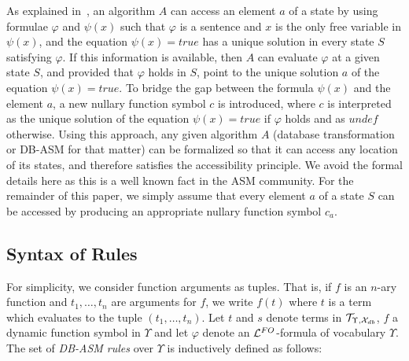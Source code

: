 \documentclass[preprint,11pt]{elsarticle}
\theoremstyle{definition}
\theoremstyle{remark}
\begin{document}
As explained in~\cite{gurevich:tocl2000}, an algorithm $A$ can access an element $a$ of a state by using formulae $\varphi$ and $\psi(x)$ such that $\varphi$ is a sentence and $x$ is the only free variable in $\psi(x)$, and the equation $\psi(x) = \textit{true}$ has a unique solution in every state $S$ satisfying $\varphi$. If this information is available, then $A$ can evaluate $\varphi$ at a given state $S$, and provided that $\varphi$ holds in $S$, point to the unique solution $a$ of the equation $\psi(x) = \textit{true}$. To bridge the gap between the formula $\psi(x)$ and the element $a$, a new nullary function symbol $c$ is introduced, where $c$ is interpreted as the unique solution of the equation $\psi(x) = \textit{true}$ if $\varphi$ holds and as $\mathit{undef}$ otherwise. Using this approach, any given algorithm $A$ (database transformation or DB-ASM for that matter) can be formalized so that it can access any location of its states, and therefore satisfies the accessibility principle. We avoid the formal details here as this is a well known fact in the ASM community. For the remainder of this paper, we simply assume that every element $a$ of a state $S$ can be accessed by producing an appropriate nullary function symbol $c_a$. 


\subsection{Syntax of Rules}
For simplicity, we consider function arguments as tuples. That is, if $f$ is an $n$-ary function and $t_1, \ldots, t_n$ are arguments for $f$, we write $f(t)$ where $t$ is a term which evaluates to the tuple $(t_1, \ldots, t_n)$.
Let $t$ and $s$ denote terms in ${\cal T}_{\Upsilon, {\cal X}_{db}}$, $f$ a dynamic function symbol in $\Upsilon$ and let $\varphi$ denote an ${\cal L}^{FO}$-formula of vocabulary $\Upsilon$. The set of {\em DB-ASM rules} over $\Upsilon$ is inductively defined as follows:
\end{document}

